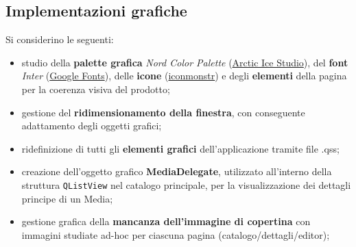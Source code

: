 \documentclass[a4paper,10pt]{article}
\begin{document}
	\subsection{Implementazioni grafiche}
	Si considerino le seguenti:
	\begin{itemize}
		\item studio della \textbf{palette grafica} \textit{Nord Color Palette} (\href{https://www.nordtheme.com/}{Arctic Ice Studio}), del \textbf{font} \textit{Inter} (\href{https://fonts.google.com/specimen/Inter}{Google Fonts}), delle \textbf{icone} (\href{https://iconmonstr.com/}{iconmonstr}) e degli \textbf{elementi} della pagina per la coerenza visiva del prodotto;
		\item gestione del \textbf{ridimensionamento della finestra}, con conseguente adattamento degli oggetti grafici;
		\item ridefinizione di tutti gli \textbf{elementi grafici} dell'applicazione tramite file .qss;
		\item creazione dell'oggetto grafico \textbf{MediaDelegate}, utilizzato all'interno della struttura \texttt{QListView} nel catalogo principale, per la visualizzazione dei dettagli principe di un Media;
		\item gestione grafica della \textbf{mancanza dell'immagine di copertina} con immagini studiate ad-hoc per ciascuna pagina (catalogo/dettagli/editor);
	\end{itemize}
	
\end{document}
